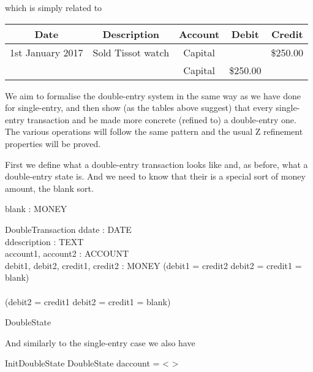 \documentclass[11pt]{amsart}
\begin{document}
which is simply related to

\begin{table}[h]
\begin{center}
\begin{tabular}{|c|c|c|c|c|}
Date & Description & Account & Debit & Credit\\
\hline \hline
1st January 2017 & Sold Tissot watch & Capital &   &\$250.00 \\
\hline
& &  Capital & \$250.00 &  \\
\end{tabular}
\end{center}
\label{default}
\end{table}%

\newpage



We aim to formalise the double-entry system in the same way as we have done for single-entry, and then show (as the tables above suggest) that every single-entry transaction and be made more concrete (refined to) a double-entry one. The various operations will follow the same pattern and the usual Z refinement properties will be proved.

First we define what a double-entry transaction looks like and, as before, what a double-entry state is. And we need to know that their is a special sort of money amount, the blank sort.

\begin{axdef}
blank : MONEY
\end{axdef}

\begin{schema}{DoubleTransaction}
ddate : DATE\\
ddescription : TEXT\\
account1, account2 : ACCOUNT\\
debit1, debit2, credit1, credit2 : MONEY
\where
(debit1 = credit2 \land debit2 = credit1 = blank)\\
\lor\\
(debit2 = credit1 \land debit2 = credit1 = blank)
\end{schema}

\begin{zed}
DoubleState 
\end{zed}

And similarly to the single-entry case we also have

\begin{schema}{InitDoubleState}
DoubleState
\where
daccount = < >
\end{schema}
\end{document}
